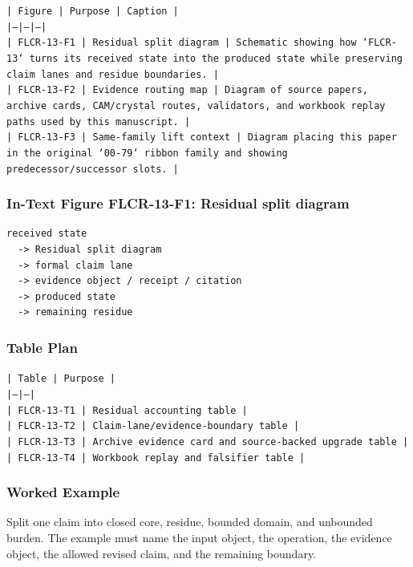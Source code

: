 \documentclass[11pt]{article}
\begin{document}
\noindent\texttt{| Figure | Purpose | Caption |}\\
\noindent\texttt{|---|---|---|}\\
\noindent\texttt{| FLCR-13-F1 | Residual split diagram | Schematic showing how `FLCR-13` turns its received state into the produced state while preserving claim lanes and residue boundaries. |}\\
\noindent\texttt{| FLCR-13-F2 | Evidence routing map | Diagram of source papers, archive cards, CAM/crystal routes, validators, and workbook replay paths used by this manuscript. |}\\
\noindent\texttt{| FLCR-13-F3 | Same-family lift context | Diagram placing this paper in the original `00-79` ribbon family and showing predecessor/successor slots. |}\\

\subsubsection*{In-Text Figure FLCR-13-F1: Residual split diagram}

\begin{verbatim}
received state
  -> Residual split diagram
  -> formal claim lane
  -> evidence object / receipt / citation
  -> produced state
  -> remaining residue
\end{verbatim}

\subsubsection*{Table Plan}

\noindent\texttt{| Table | Purpose |}\\
\noindent\texttt{|---|---|}\\
\noindent\texttt{| FLCR-13-T1 | Residual accounting table |}\\
\noindent\texttt{| FLCR-13-T2 | Claim-lane/evidence-boundary table |}\\
\noindent\texttt{| FLCR-13-T3 | Archive evidence card and source-backed upgrade table |}\\
\noindent\texttt{| FLCR-13-T4 | Workbook replay and falsifier table |}\\

\subsubsection*{Worked Example}

Split one claim into closed core, residue, bounded domain, and unbounded burden. The example must name the input object, the operation,
the evidence object, the allowed revised claim, and the remaining boundary.
\end{document}
